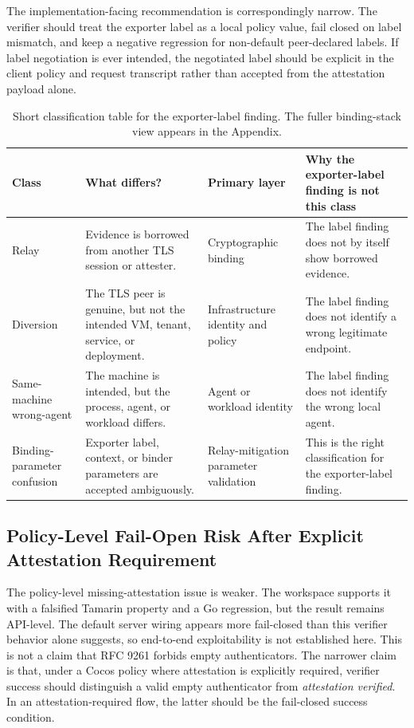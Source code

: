 \documentclass[11pt,a4paper]{article}
\begin{document}
The implementation-facing recommendation is correspondingly narrow. The
verifier should treat the exporter label as a local policy value, fail closed
on label mismatch, and keep a negative regression for non-default
peer-declared labels. If label negotiation is ever intended, the negotiated
label should be explicit in the client policy and request transcript rather
than accepted from the attestation payload alone.

\begin{table}[H]
\centering
\footnotesize
\begin{tabularx}{\textwidth}{@{}>{\raggedright\arraybackslash}p{}>{\raggedright\arraybackslash}p{}>{\raggedright\arraybackslash}p{}>{\raggedright\arraybackslash}X@{}}
\toprule
\textbf{Class} & \textbf{What differs?} & \textbf{Primary layer} & \textbf{Why the exporter-label finding is not this class} \\
\midrule
Relay & Evidence is borrowed from another TLS session or attester. & Cryptographic binding & The label finding does not by itself show borrowed evidence. \\
Diversion & The TLS peer is genuine, but not the intended VM, tenant, service, or deployment. & Infrastructure identity and policy & The label finding does not identify a wrong legitimate endpoint. \\
Same-machine wrong-agent & The machine is intended, but the process, agent, or workload differs. & Agent or workload identity & The label finding does not identify the wrong local agent. \\
Binding-parameter confusion & Exporter label, context, or binder parameters are accepted ambiguously. & Relay-mitigation parameter validation & This is the right classification for the exporter-label finding. \\
\bottomrule
\end{tabularx}
\caption{Short classification table for the exporter-label finding. The fuller binding-stack view appears in the Appendix.}
\label{tab:exporter-label-classification}
\end{table}

\subsection{Policy-Level Fail-Open Risk After Explicit Attestation Requirement}

The policy-level missing-attestation issue is weaker. The workspace supports it
with a falsified Tamarin property and a Go regression, but the result remains
API-level. The default server wiring appears more fail-closed than this
verifier behavior alone suggests, so end-to-end exploitability is not
established here. This is not a claim that RFC 9261 forbids empty
authenticators. The narrower claim is that, under a Cocos policy where
attestation is explicitly required, verifier success should distinguish a
valid empty authenticator from \emph{attestation verified}. In an
attestation-required flow, the latter should be the fail-closed success
condition.
\end{document}
